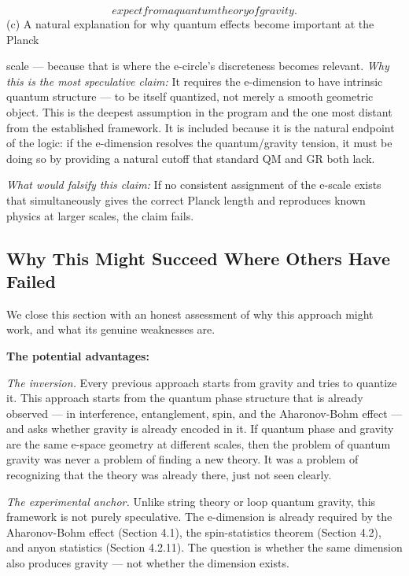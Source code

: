 \documentclass[aps,prd,preprint,superscriptaddress,longbibliography,floatfix]{revtex4-2}
\theoremstyle{remark}
\begin{document}
\begin{equation}
    expect from a quantum theory of gravity.
\end{equation}
(c) A natural explanation for why quantum effects become important at the Planck

scale --- because that is where the e-circle's discreteness becomes relevant.
\textit{Why this is the most speculative claim:} It requires the e-dimension to have intrinsic quantum structure --- to be itself quantized, not merely a smooth geometric object. This is the deepest assumption in the program and the one most distant from the established framework. It is included because it is the natural endpoint of the logic: if the e-dimension resolves the quantum/gravity tension, it must be doing so by providing a natural cutoff that standard QM and GR both lack.

\textit{What would falsify this claim:} If no consistent assignment of the e-scale exists that simultaneously gives the correct Planck length and reproduces known physics at larger scales, the claim fails.



\subsection{Why This Might Succeed Where Others Have Failed}

We close this section with an honest assessment of why this approach might work, and what its genuine weaknesses are.

\textbf{The potential advantages:}

\textit{The inversion.} Every previous approach starts from gravity and tries to quantize it. This approach starts from the quantum phase structure that is already observed --- in interference, entanglement, spin, and the Aharonov-Bohm effect --- and asks whether gravity is already encoded in it. If quantum phase and gravity are the same e-space geometry at different scales, then the problem of quantum gravity was never a problem of finding a new theory. It was a problem of recognizing that the theory was already there, just not seen clearly.

\textit{The experimental anchor.} Unlike string theory or loop quantum gravity, this framework is not purely speculative. The e-dimension is already required by the Aharonov-Bohm effect (Section 4.1), the spin-statistics theorem (Section 4.2), and anyon statistics (Section 4.2.11). The question is whether the same dimension also produces gravity --- not whether the dimension exists.
\end{document}
